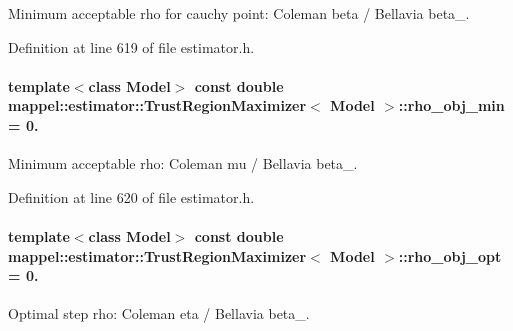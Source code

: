 Minimum acceptable rho for cauchy point\+: Coleman beta / Bellavia beta\+\_. 



Definition at line 619 of file estimator.\+h.

\paragraph[{\texorpdfstring{rho\+\_\+obj\+\_\+min}{rho_obj_min}}]{\setlength{\rightskip}{0pt plus 5cm}template$<$class Model$>$ const double {\bf mappel\+::estimator\+::\+Trust\+Region\+Maximizer}$<$ Model $>$\+::rho\+\_\+obj\+\_\+min = 0.\hspace{0.3cm}{\ttfamily [static]}}\hypertarget{classmappel_1_1estimator_1_1TrustRegionMaximizer_ace606c3accfccbab718561d9f09acd71}{}\label{classmappel_1_1estimator_1_1TrustRegionMaximizer_ace606c3accfccbab718561d9f09acd71}


Minimum acceptable rho\+: Coleman mu / Bellavia beta\+\_. 



Definition at line 620 of file estimator.\+h.

\paragraph[{\texorpdfstring{rho\+\_\+obj\+\_\+opt}{rho_obj_opt}}]{\setlength{\rightskip}{0pt plus 5cm}template$<$class Model$>$ const double {\bf mappel\+::estimator\+::\+Trust\+Region\+Maximizer}$<$ Model $>$\+::rho\+\_\+obj\+\_\+opt = 0.\hspace{0.3cm}{\ttfamily [static]}}\hypertarget{classmappel_1_1estimator_1_1TrustRegionMaximizer_aad57ec37be10886756806ec66600f6d7}{}\label{classmappel_1_1estimator_1_1TrustRegionMaximizer_aad57ec37be10886756806ec66600f6d7}


Optimal step rho\+: Coleman eta / Bellavia beta\+\_. 



